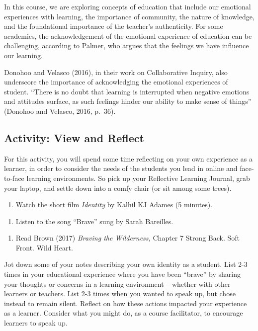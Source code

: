 \documentclass[
]{book}
\providecommand{\tightlist}{%
  \setlength{\itemsep}{0pt}\setlength{\parskip}{0pt}}
\begin{document}
In this course, we are exploring concepts of education that include our emotional experiences with learning, the importance of community, the nature of knowledge, and the foundational importance of the teacher's authenticity. For some academics, the acknowledgement of the emotional experience of education can be challenging, according to Palmer, who argues that the feelings we have influence our learning.

Donohoo and Velasco (2016), in their work on Collaborative Inquiry, also underscore the importance of acknowledging the emotional experiences of student. ``There is no doubt that learning is interrupted when negative emotions and attitudes surface, as such feelings hinder our ability to make sense of things'' (Donohoo and Velasco, 2016, p.~36).

\hypertarget{activity-view-and-reflect-1}{%
\subsection{Activity: View and Reflect}\label{activity-view-and-reflect-1}}

\begin{reflect}
For this activity, you will spend some time reflecting on your own
experience as a learner, in order to consider the needs of the students
you lead in online and face-to-face learning environments. So pick up
your Reflective Learning Journal, grab your laptop, and settle down into
a comfy chair (or sit among some trees).

\begin{enumerate}
\def\labelenumi{\arabic{enumi}.}
\tightlist
\item
  Watch the short film \emph{Identity} by Kalhil KJ Adames (5 minutes).
\end{enumerate}

\begin{enumerate}
\def\labelenumi{\arabic{enumi}.}
\setcounter{enumi}{1}
\tightlist
\item
  Listen to the song ``Brave'' sung by Sarah Bareilles.
\end{enumerate}

\begin{enumerate}
\def\labelenumi{\arabic{enumi}.}
\setcounter{enumi}{2}
\tightlist
\item
  Read Brown (2017) \emph{Braving the Wilderness,} Chapter 7 Strong
  Back. Soft Front. Wild Heart.
\end{enumerate}

Jot down some of your notes describing your own identity as a student.
List 2-3 times in your educational experience where you have been
``brave'' by sharing your thoughts or concerns in a learning environment
-- whether with other learners or teachers. List 2-3 times when you
wanted to speak up, but chose instead to remain silent. Reflect on how
these actions impacted your experience as a learner. Consider what you
might do, as a course facilitator, to encourage learners to speak up.
\end{reflect}
\end{document}

